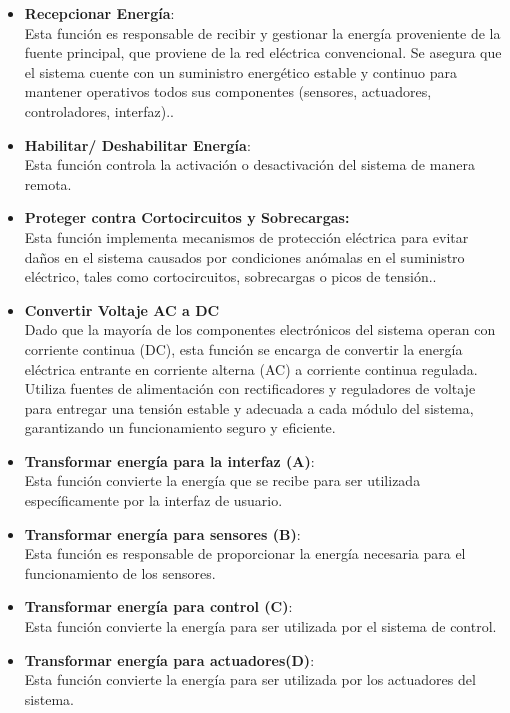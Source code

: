 \documentclass[12pt,a4paper,oneside]{report}
\begin{document}
\begin{itemize}
\item
  \textbf{Recepcionar Energía}:\\
  Esta función es responsable de recibir y gestionar la energía proveniente de la fuente principal, que proviene de la red eléctrica convencional. Se asegura que el sistema cuente con un suministro energético estable y continuo para mantener operativos todos sus componentes (sensores, actuadores, controladores, interfaz)..
\item
  \textbf{Habilitar/ Deshabilitar Energía}:\\
  Esta función controla la activación o desactivación del sistema de manera remota.
\item
  \textbf{Proteger contra Cortocircuitos y Sobrecargas:}\\
  Esta función implementa mecanismos de protección eléctrica para evitar daños en el sistema causados por condiciones anómalas en el suministro eléctrico, tales como cortocircuitos, sobrecargas o picos de tensión..
\item
  \textbf{Convertir Voltaje AC a DC}\\
  Dado que la mayoría de los componentes electrónicos del sistema operan con corriente continua (DC), esta función se encarga de convertir la energía eléctrica entrante en corriente alterna (AC) a corriente continua regulada. Utiliza fuentes de alimentación con rectificadores y reguladores de voltaje para entregar una tensión estable y adecuada a cada módulo del sistema, garantizando un funcionamiento seguro y eficiente.
\item
  \textbf{Transformar energía para la interfaz (A)}:\\
  Esta función convierte la energía que se recibe para ser utilizada específicamente por la interfaz de usuario.
\item
  \textbf{Transformar energía para sensores (B)}:\\
  Esta función es responsable de proporcionar la energía necesaria para el funcionamiento de los sensores.
\item
  \textbf{Transformar energía para control (C)}:\\
  Esta función convierte la energía para ser utilizada por el sistema de control.
\item
  \textbf{Transformar energía para actuadores(D)}:\\
  Esta función convierte la energía para ser utilizada por los actuadores del sistema.
\end{itemize}
\end{document}
